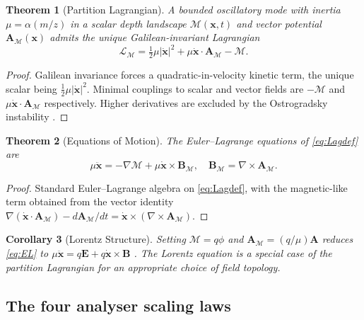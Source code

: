 \documentclass[twocolumn,10pt,a4paper]{article}
\theoremstyle{thmstyle}
\newtheorem{theorem}{Theorem}[section]
\newtheorem{corollary}[theorem]{Corollary}
\theoremstyle{definition}
\theoremstyle{remark}
\newcommand{\Depth}{\mathcal{M}}
\newcommand{\Lagr}{\mathcal{L}}
\newcommand{\partinert}{\mu}
\newcommand{\Apartition}{\mathbf{A}_{\Depth}}
\begin{document}
\begin{theorem}[Partition Lagrangian]
\label{thm:Lag}
A bounded oscillatory mode with inertia $\partinert=\alpha(m/z)$ in a
scalar depth landscape $\Depth(\mathbf{x},t)$ and vector potential
$\Apartition(\mathbf{x})$ admits the unique Galilean-invariant
Lagrangian
\begin{equation}
\boxed{\;\Lagr_{\Depth}=\tfrac{1}{2}\partinert|\dot{\mathbf{x}}|^{2}
+\partinert\dot{\mathbf{x}}\cdot\Apartition-\Depth.\;}
\label{eq:Lagdef}
\end{equation}
\end{theorem}

\begin{proof}
Galilean invariance forces a quadratic-in-velocity kinetic term, the
unique scalar being $\tfrac{1}{2}\partinert|\dot{\mathbf{x}}|^{2}$.
Minimal couplings to scalar and vector fields are $-\Depth$ and
$\partinert\dot{\mathbf{x}}\cdot\Apartition$ respectively. Higher
derivatives are excluded by the Ostrogradsky instability
\citep{ostrogradsky1850}.
\end{proof}

\begin{theorem}[Equations of Motion]
\label{thm:EOM}
The Euler--Lagrange equations of \eqref{eq:Lagdef} are
\begin{equation}
\partinert\ddot{\mathbf{x}}=-\nabla\Depth
+\partinert\dot{\mathbf{x}}\times\mathbf{B}_{\Depth},
\quad
\mathbf{B}_{\Depth}=\nabla\times\Apartition.
\label{eq:EL}
\end{equation}
\end{theorem}

\begin{proof}
Standard Euler--Lagrange algebra on \eqref{eq:Lagdef}, with the
magnetic-like term obtained from the vector identity
$\nabla(\dot{\mathbf{x}}\cdot\Apartition)-d\Apartition/dt
=\dot{\mathbf{x}}\times(\nabla\times\Apartition)$.
\end{proof}

\begin{corollary}[Lorentz Structure]
\label{cor:lor}
Setting $\Depth=q\phi$ and $\Apartition=(q/\partinert)\mathbf{A}$
reduces \eqref{eq:EL} to
$\partinert\ddot{\mathbf{x}}=q\mathbf{E}+q\dot{\mathbf{x}}\times\mathbf{B}$
\citep{jackson1999}. The Lorentz equation is a special case of the
partition Lagrangian for an appropriate choice of field topology.
\end{corollary}

\subsection{The four analyser scaling laws}
\end{document}
